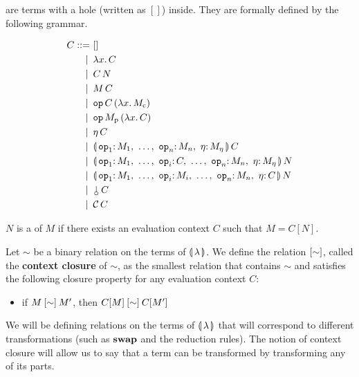 \begin{definition}
   are terms with a hole (written as $[]$)
  inside. They are formally defined by the following grammar.

  \begin{align*}
  C ::= &\ [] \\
   | \, &\ \lam{x}{C}  \\
   | \, &\ \ap{C}{N}  \\
   | \, &\ \ap{M}{C}  \\
   | \, &\ \app{\op{op}}{C}{(\lam{x}{M_{\mathrm{c}}})} \\
   | \, &\ \app{\op{op}}{M_{\mathrm{p}}}{(\lam{x}{C})} \\
   | \, &\ \ap{\eta}{C} \\
   | \, &\ \ap{\banana{\onto{\op{op}_1} M_1,\ \dots,\ \onto{\op{op}_n} M_n,\ \onto{\eta} M_\eta}}{C} \\
   | \, &\ \ap{\banana{\onto{\op{op}_1} M_1,\ \dots,\ \onto{\op{op}_i}{C},\ \dots,\ \onto{\op{op}_n} M_n,\ \onto{\eta} M_\eta}}{N} \\
   | \, &\ \ap{\banana{\onto{\op{op}_1} M_1,\ \dots,\ \onto{\op{op}_i}{M_i},\ \dots,\ \onto{\op{op}_n} M_n,\ \onto{\eta} C}}{N} \\
   | \, &\ \ap{\cherry}{C} \\
   | \, &\ \ap{\CC}{C}
  \end{align*}
\end{definition}

\begin{definition}
  $N$ is a  of $M$ if there exists an evaluation context $C$
  such that $M = C[N]$.
\end{definition}

\begin{definition}\label{def:context-closure}
  Let $\sim$ be a binary relation on the terms of ${\llparenthesis \, \lambda \, \rrparenthesis}$. We define
  the relation $\mathbin{[\sim]}$, called the \textbf{context closure} of
  $\sim$, as the smallest relation that contains $\sim$ and satisfies the
  following closure property for any evaluation context $C$:

  \begin{itemize}
    \item if $M \mathbin{[\sim]} M'$, then $C[M] \mathbin{[\sim]} C[M']$
  \end{itemize}
\end{definition}

We will be defining relations on the terms of ${\llparenthesis \, \lambda \, \rrparenthesis}$ that will
correspond to different transformations (such as $\mathbin{\textbf{swap}}$ and the reduction
rules). The notion of context closure will allow us to say that a term can
be transformed by transforming any of its parts.


